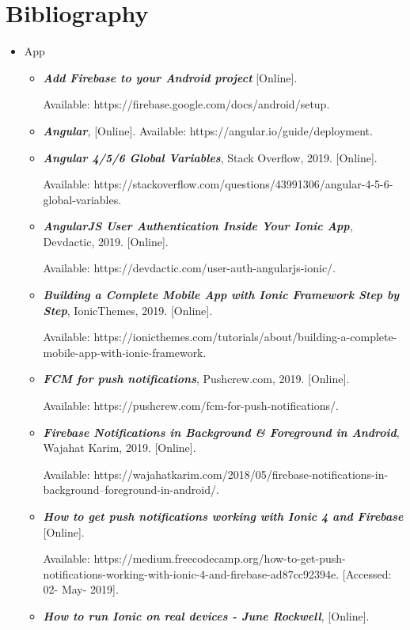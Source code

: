 \documentclass[12pt, a4paper]{report}
\begin{document}
\chapter{Bibliography}
\begin{itemize}
    \item App
    \begin{itemize}
        \item \textit{\textbf{Add Firebase to your Android project}} [Online]. 
        
        Available: https://firebase.google.com/docs/android/setup. 
        \item\textit{\textbf{Angular}}, [Online]. Available: https://angular.io/guide/deployment. 
        \item \textbf{\textit{Angular 4/5/6 Global Variables}}, Stack Overflow, 2019. [Online]. 
        
        Available: https://stackoverflow.com/questions/43991306/angular-4-5-6-global-variables. 
        \item\textit{\textbf{AngularJS User Authentication Inside Your Ionic App}}, Devdactic, 2019. [Online]. 
        
        Available: https://devdactic.com/user-auth-angularjs-ionic/. 
        \item\textit{\textbf{Building a Complete Mobile App with Ionic Framework Step by Step}}, IonicThemes, 2019. [Online].
        
        Available: https://ionicthemes.com/tutorials/about/building-a-complete-mobile-app-with-ionic-framework. 
        \item\textit{\textbf{FCM for push notifications}}, Pushcrew.com, 2019. [Online]. 
        
        Available: https://pushcrew.com/fcm-for-push-notifications/. 
        \item\textit{\textbf{Firebase Notifications in Background & Foreground in Android}}, Wajahat Karim, 2019. [Online].
        
        Available: https://wajahatkarim.com/2018/05/firebase-notifications-in-background--foreground-in-android/. 
        \item\textit{\textbf{How to get push notifications working with Ionic 4 and Firebase}} [Online]. 
        
        Available: https://medium.freecodecamp.org/how-to-get-push-notifications-working-with-ionic-4-and-firebase-ad87cc92394e. [Accessed: 02- May- 2019].
        \item\textit{\textbf{How to run Ionic on real devices - June Rockwell}},  [Online].
        

\end{itemize}
\end{itemize}
\end{document}
